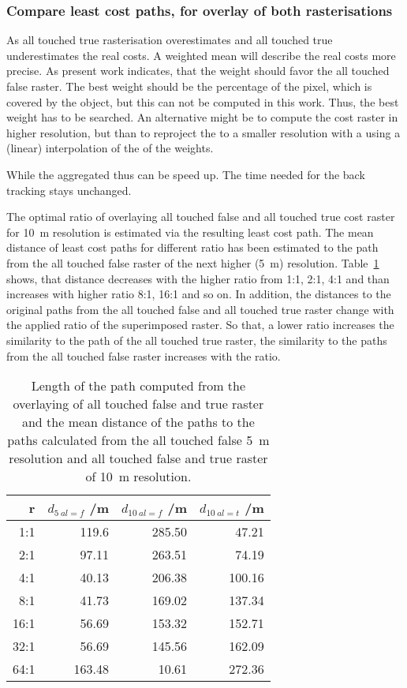 \subsubsection{Compare least cost paths, for overlay of both rasterisations}

As all touched true rasterisation overestimates and all touched true underestimates the real costs.
A weighted mean will describe the real costs more precise.
As present work indicates, that the weight should favor the all touched false raster.
The best weight should be the percentage of the pixel, which is covered by the object, but this can not be computed in this work.
Thus, the best weight has to be searched.
An alternative might be to compute the cost raster in higher resolution, but than to reproject the to a smaller resolution with a using a (linear) interpolation of the of the weights.

While the aggregated thus can be speed up.
The time needed for the back tracking stays unchanged.

The optimal ratio of overlaying all touched false and all touched true cost raster for 10~m resolution is estimated via the resulting least cost path. 
The mean distance of least cost paths for different ratio has been estimated to the path from the all touched false raster of the next higher (5~m) resolution. 
Table~\ref{tab:4} shows, that distance decreases with the higher ratio from 1:1, 2:1, 4:1 and than increases with higher ratio 8:1, 16:1 and so on.
In addition, the distances to the original paths from the all touched false and all touched true raster change with the applied ratio of the superimposed raster.
So that, a lower ratio increases the similarity to the path of the all touched true raster, the similarity to the paths from the all touched false raster increases with the ratio.

\begin{table}[h!]
	\caption{Length of the path computed from the overlaying of all touched false and true raster and the mean distance of the paths to the paths calculated from the all touched false 5~m resolution  and all touched false and true raster of 10~m resolution.}
	\label{tab:4}
	\centering
	\begin{tabular}{ r  r  r  r}
		r & $d_{5~al=f}$ /m &  $d_{10~al=f}$ /m & $d_{10~al=t}$ /m \\
		\hline
		
		  1:1  &    119.6 &  285.50 &  47.21\\
		  2:1  &    97.11 &  263.51 &  74.19\\
		  4:1  &    40.13 &  206.38 & 100.16\\
		  8:1  &    41.73 &  169.02 & 137.34\\
		 16:1  &    56.69 &  153.32 & 152.71\\
		 32:1  &    56.69 &  145.56 & 162.09\\
		 64:1  &   163.48 &   10.61 & 272.36\\
		
	\end{tabular}
\end{table}


